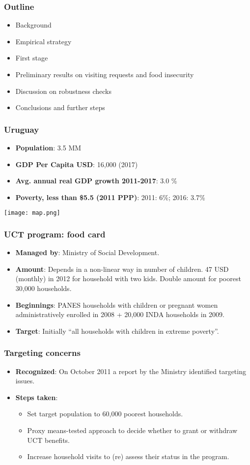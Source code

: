 \documentclass{beamer}
\begin{document}
\begin{frame}
\frametitle{Outline}
\begin{itemize}
\item Background
\item Empirical strategy
\item First stage
\item Preliminary results on visiting requests and food insecurity
\item Discussion on robustness checks
\item Conclusions and further steps
\end{itemize}
\end{frame}

\begin{frame}
\frametitle{Uruguay}
\begin{itemize}
\item \textbf{Population}: 3.5 MM
\item \textbf{GDP Per Capita USD}: 16,000 (2017)
\item \textbf{Avg. annual real GDP growth 2011-2017}: 3.0 \%
\item \textbf{Poverty, less than \$5.5 (2011 PPP)}: 2011: 6\%; 2016: 3.7\%	
\end{itemize}
\begin{center}
	\texttt{[image: map.png]}
	\label{map}
\end{center}
\end{frame}

\begin{frame}
\frametitle{UCT program: food card}
\begin{itemize}
\item \textbf{Managed by}: Ministry of Social Development.
\item \textbf{Amount}: Depends in a non-linear way in number of children. 47 USD (monthly) in 2012 for household with two kids. Double amount for poorest 30,000 households.
\item \textbf{Beginnings}: PANES households with children or pregnant women administratively enrolled in 2008 + 20,000 INDA households in 2009.
\item \textbf{Target}: Initially ``all households with children in extreme poverty''.		
\end{itemize}
\end{frame}

\begin{frame}
\frametitle{Targeting concerns}
\begin{itemize}
\item \textbf{Recognized}: On October 2011 a report by the Ministry identified targeting issues.
\item \textbf{Steps taken}:
\begin{itemize}
\item Set target population to 60,000 poorest households.
\item Proxy means-tested approach to decide whether to grant or withdraw UCT benefits.
\item Increase household visits to (re) assess their status in the program.
\end{itemize}	
\end{itemize}
\end{frame}
\end{document}
